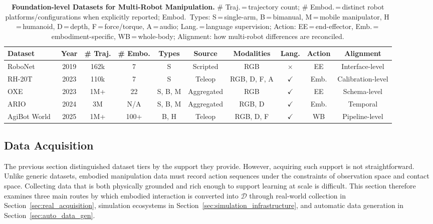 \documentclass[acmsmall,screen,review]{acmart}
\begin{document}
\begin{table}[t]
\centering
\caption{\textbf{Foundation-level Datasets for Multi-Robot Manipulation.}
\# Traj.\,=\,trajectory count;
\# Embod.\,=\,distinct robot platforms/configurations when explicitly reported;
Embod.\ Types: S\,=\,single-arm, B\,=\,bimanual, M\,=\,mobile manipulator, H\,=\,humanoid,
 D\,=\,depth, F\,=\,force/torque, A\,=\,audio;
Lang.\,=\,language supervision;
Action: EE\,=\,end-effector, Emb.\,=\,embodiment-specific, WB\,=\,whole-body;
Alignment: how multi-robot differences are reconciled.}\label{tab:foundation_datasets}
\scriptsize
\begin{tabular}{lccccccccc}
\toprule
\textbf{Dataset} & \textbf{Year} & \textbf{\# Traj.} & \textbf{\# Embo.} & \textbf{Types} & \textbf{Source} & \textbf{Modalities} & \textbf{Lang.} & \textbf{Action} & \textbf{Alignment} \\
\midrule
RoboNet~\cite{dasari2020robonet} & 2019 & 162k & 7 & S & Scripted & RGB & $\times$ & EE & Interface-level \\
RH-20T~\cite{fang2023rh} & 2023 & 110k & 7 & S & Teleop & RGB, D, F, A & $\checkmark$ & Emb. & Calibration-level \\
OXE~\cite{padalkar2023open} & 2023 & 1M+ & 22 & S, B, M & Aggregated & RGB & $\checkmark$ & EE & Schema-level \\
ARIO~\cite{wang2024ario} & 2024 & 3M & N/A & S, B, M & Aggregated & RGB, D & $\checkmark$ & Emb. & Temporal \\
AgiBot World~\cite{agibot2025} & 2025 & 1M+ & 100+ & B, H & Teleop & RGB, D, F & $\checkmark$ & WB & Pipeline-level \\
\bottomrule
\end{tabular}
\end{table}

\subsection{Data Acquisition}\label{sec:data_acquisition}

The previous section distinguished dataset tiers by the support they provide. 
However, acquiring such support is not straightforward. 
Unlike generic datasets, embodied manipulation data must record action sequences under the constraints of observation space and contact space. 
Collecting data that is both physically grounded and rich enough to support learning at scale is difficult. 
This section therefore examines three main routes by which embodied interaction is converted into \(\mathcal{D}\) through real-world collection in Section~\ref{sec:real_acquisition}, simulation ecosystems in Section~\ref{sec:simulation_infrastructure}, and automatic data generation in Section~\ref{sec:auto_data_gen}. 
\end{document}
